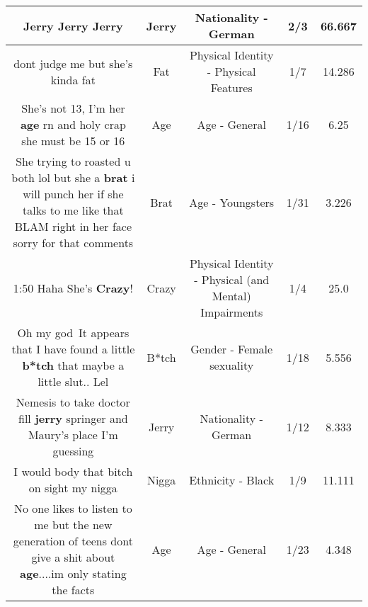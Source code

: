 \documentclass[11pt]{article}
\newlength\mylength
\begin{document}
\begin{center}
\begin{longtable}{|C{.65\mylength}|C{.30\mylength}|C{.12\mylength}|C{.12\mylength}|C{.12\mylength}|}
  \small Jerry \textbf{Jerry} Jerry\normalsize   & Jerry & Nationality - German & 2/3 & 66.667 \\  \hline
  \small dont judge me but she's kinda fat\normalsize   & Fat & Physical Identity - Physical Features & 1/7 & 14.286 \\  \hline
  \small She's not 13, I'm her \textbf{age} rn and holy crap she must be 15 or 16\normalsize   & Age & Age - General & 1/16 & 6.25 \\  \hline
  \small She trying to roasted u both lol but she a \textbf{brat} i will punch her if she talks to  me like that BLAM right in her face sorry for that comments\normalsize   & Brat & Age - Youngsters & 1/31 & 3.226 \\  \hline
  \small 1:50 Haha She's \textbf{Crazy}!\normalsize   & Crazy & Physical Identity - Physical (and Mental) Impairments & 1/4 & 25.0 \\  \hline
  \small Oh my god~It appears that I have found a little \textbf{b*tch} that maybe a little slut.. Lel\normalsize   & B*tch & Gender - Female sexuality & 1/18 & 5.556 \\  \hline
  \small Nemesis to take doctor fill \textbf{jerry} springer and Maury's place I'm guessing\normalsize   & Jerry & Nationality - German & 1/12 & 8.333 \\  \hline
  \small I would body that bitch on sight my nigga\normalsize   & Nigga & Ethnicity - Black & 1/9 & 11.111 \\  \hline
  \small No one likes to listen to me but the new generation of teens dont give a shit about \textbf{age}....im only stating the facts\normalsize   & Age & Age - General & 1/23 & 4.348 \\  \hline

\end{longtable}
\end{center}
\end{document}
